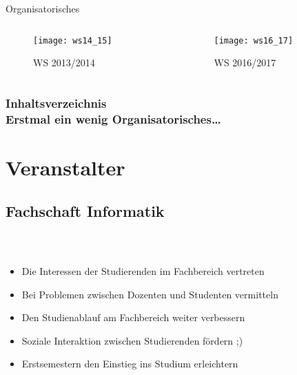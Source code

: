 

\usepackage{listings}
\usepackage{tikz}



\begin{titleframe}
	\begin{center}
		{\huge Organisatorisches}
	\end{center}
	\vspace{-5mm}
	\begin{columns}
		\begin{column}{6cm}
			\begin{figure}
				\centering
				\texttt{[image: ws14\_15]}
				\caption{WS 2013/2014}
			\end{figure}
		\end{column}
		\begin{column}{6cm}
			\begin{figure}
				\centering
				\texttt{[image: ws16\_17]}
				\caption{WS 2016/2017}
			\end{figure}
		\end{column}
	\end{columns}

\end{titleframe}

\begin{frame}[t]
	\frametitle{Inhaltsverzeichnis \\ {\small Erstmal ein wenig Organisatorisches…}}
	{\small	\tableofcontents[subsectionstyle=shaded]}
\end{frame}


\section{Veranstalter}
\subsection*{Fachschaft Informatik}
\begin{frame}
	\frametitle{\insertsectionhead \\ {\small \insertsubsectionhead}}
	\begin{itemize}
		\item Die Interessen der Studierenden im Fachbereich vertreten
		\item Bei Problemen zwischen Dozenten und Studenten vermitteln
		\item Den Studienablauf am Fachbereich weiter verbessern
		\item Soziale Interaktion zwischen Studierenden fördern ;)
		\item Erstsemestern den Einstieg ins Studium erleichtern
	\end{itemize}
\end{frame}

